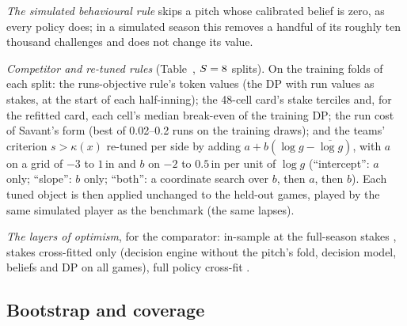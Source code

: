 \documentclass[aoas]{imsart}
\theoremstyle{plain}
\theoremstyle{definition}
\begin{document}
\emph{The simulated behavioural rule} skips a pitch whose calibrated belief is zero, as every policy does; in a
simulated season this removes a handful of its roughly ten thousand challenges and does not change its value.

\emph{Competitor and re-tuned rules} (Table~, $S=8$ splits). On the training folds of each split:
the runs-objective rule's token values (the DP with run values as stakes, at the start of each half-inning); the
48-cell card's stake terciles and, for the refitted card, each cell's median break-even of the training DP; the run
cost of Savant's form (best of 0.02--0.2 runs on the training draws); and the teams' criterion $s>\kappa(x)$ re-tuned per
side by adding $a+b(\log g-\overline{\log g})$, with $a$ on a grid of $-3$ to $1$\,in and $b$ on $-2$ to $0.5$\,in per unit
of $\log g$ (``intercept'': $a$ only; ``slope'': $b$ only; ``both'': a coordinate search over $b$, then $a$, then $b$).
Each tuned object is then applied unchanged to the held-out games, played by the same simulated player as the
benchmark (the same lapses).

\emph{The layers of optimism}, for the comparator: in-sample at the full-season stakes \WinsLostFull, stakes
cross-fitted only \WinsLost{} (decision engine without the pitch's fold, decision model, beliefs and DP on all games),
full policy cross-fit \GapMain.

\subsection{Bootstrap and coverage}\label{sec:bootstrap}
\end{document}
